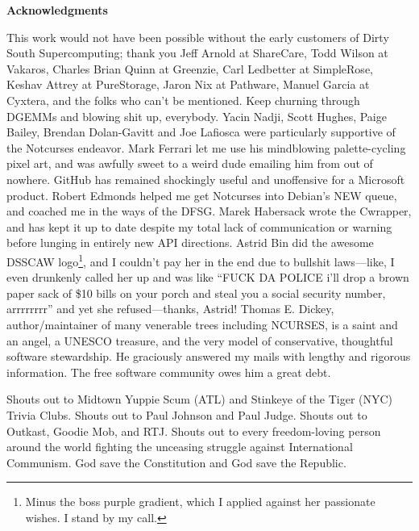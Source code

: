 \documentclass[letterpaper,10pt]{article}
\newcommand\CC{C\nolinebreak\hspace{-.05em}\raisebox{.4ex}{\relsize{-3}{\textbf{+}}}\nolinebreak\hspace{-.10em}\raisebox{.4ex}{\relsize{-3}{\textbf{+}}}\hspace{.2em}}
\begin{document}
\newpage
\glsaddallunused
\printglossary[title={Glossary of terms}]
\newpage
\printbibliography
\newpage
\vspace*{2in}
\begin{center}\textbf{Acknowledgments}\end{center}

This work would not have been possible without the early customers of
Dirty South Supercomputing; thank you Jeff Arnold at ShareCare,
Todd Wilson at Vakaros, Charles Brian Quinn at Greenzie, Carl Ledbetter
at SimpleRose, Keshav Attrey at PureStorage, Jaron Nix at Pathware,
Manuel Garcia at Cyxtera, and the folks who can't be mentioned. Keep
churning through DGEMMs and blowing shit up, everybody. Yacin Nadji,
Scott Hughes, Paige Bailey, Brendan Dolan-Gavitt and Joe Lafiosca were
particularly supportive of the Notcurses endeavor. Mark Ferrari let me use
his mindblowing palette-cycling pixel art, and was awfully sweet to a weird
dude emailing him from out of nowhere. GitHub has remained
shockingly useful and unoffensive for a Microsoft product. Robert Edmonds
helped me get Notcurses into Debian's NEW queue, and coached me in the ways
of the DFSG. Marek Habersack wrote the \CC wrapper, and has kept it up to date despite my
total lack of communication or warning before lunging in entirely new
API directions. Astrid Bin did the awesome DSSCAW logo\footnote{Minus the boss purple gradient, which I applied against her passionate wishes. I stand by my call.}, and I couldn't
pay her in the end due to bullshit laws---like, I even drunkenly called her up
and was like ``FUCK DA POLICE i'll drop a brown paper sack of \$10 bills
on your porch and steal you a social security number, arrrrrrrr'' and yet
she refused---thanks, Astrid! Thomas E. Dickey,
author/maintainer of many venerable trees including NCURSES, is a saint and an
angel, a UNESCO treasure, and the very model of conservative, thoughtful
software stewardship. He graciously answered my mails with lengthy and rigorous
information. The free software community owes him a great debt.

Shouts out to Midtown Yuppie Scum (ATL) and Stinkeye of the Tiger (NYC) Trivia
Clubs. Shouts out to Paul Johnson and Paul Judge. Shouts out to Outkast, Goodie
Mob, and RTJ. Shouts out to every freedom-loving person around the world
fighting the unceasing struggle against International Communism. God save the
Constitution and God save the Republic.

\end{document}
